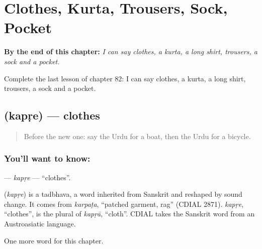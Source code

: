 
\chapter{Clothes, Kurta, Trousers, Sock, Pocket}
\label{ch:ur-clothes-kurta-trousers-sock-pocket}

\begin{chapteropening}
\textbf{By the end of this chapter:} \emph{I can say clothes, a kurta, a long shirt, trousers, a sock and a pocket.}

Complete the last lesson of chapter 82: I can say clothes, a kurta, a long shirt, trousers, a sock and a pocket.
\end{chapteropening}

\section[\texorpdfstring{\ur{کپڑے} (kapṛe)}{کپڑے (kapṛe)}]{ (kapṛe) — clothes}

\label{lesson:UR-C82-kapre}



\begin{quote}
Before the new one: say the Urdu for a boat, then the Urdu for a bicycle.
\end{quote}

\subsection*{You'll want to know: }
\textbf{} — \emph{kapṛe} — \textquotedblleft{}clothes\textquotedblright{}.

\begin{cousinweb}
\textbf{} (\emph{kapṛe}) is a tadbhava, a word inherited from Sanskrit and reshaped by sound change. It comes from \emph{karpaṭa}, \textquotedblleft{}patched garment, rag\textquotedblright{} (CDIAL 2871). \emph{kapṛe}, \textquotedblleft{}clothes\textquotedblright{}, is the plural of \emph{kapṛā}, \textquotedblleft{}cloth\textquotedblright{}. CDIAL takes the Sanskrit word from an Austroasiatic language.
\end{cousinweb}

\begin{grammarlens}[title={What you've built}]
One more word for this chapter.
\end{grammarlens}

